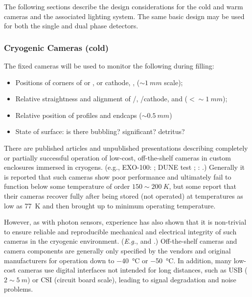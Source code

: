 The following sections describe the design considerations for the cold
and warm cameras and the associated lighting system.  The same basic
design may be used for both the single and dual phase detectors.



\subsubsection{Cryogenic Cameras (cold)}

The fixed cameras will be used to monitor the following during filling:
\begin{itemize}
\item Positions of corners of  or ,  or cathode, ,  (\(\sim\SI{1}{mm}\) scale);
\item Relative straightness and alignment of /, /cathode, and  (\(<\sim\SI{1}{mm}\));
\item Relative position of profiles and endcaps (\(\sim\SI{0.5}{mm}\))
\item State of \lar surface: is there bubbling? significant? detritus?
\end{itemize}

There are published articles and unpublished presentations describing
completely or partially successful operation of low-cost,
off-the-shelf  cameras in custom enclosures immersed in cryogens.
(e.g., EXO-100: \cite{Delaquis:2013hva}; DUNE  test
\cite{McConkey:2016spe}; : \cite{Murphy:20170516}.)  Generally
it is reported that such cameras show poor performance and ultimately
fail to function below some temperature of order \(150\sim\SI{200}{K}\), but some report that their cameras recover fully after
being stored (not operated) at temperatures as low as \SI{77}{K} and
then brought up to minimum operating temperature.

However, as with photon sensors, experience has also shown that it is
non-trivial to ensure reliable and reproducible mechanical and
electrical integrity of such cameras in the cryogenic environment.
({\em E.g.}, \cite{McConkey:2016spe} and
\cite{Valencia-Rodriquez:20180130}.)  Off-the-shelf cameras and camera
components are generally only specified by the vendors and original
manufacturers for operation down to \SI{-40}{\celsius} or \SI{-50}{\celsius}.
In addition, many low-cost cameras use digital interfaces not intended
for long distances, such as USB (\(2\sim\SI{5}{m}\)) or CSI (circuit
board scale), leading to signal degradation and noise problems.

